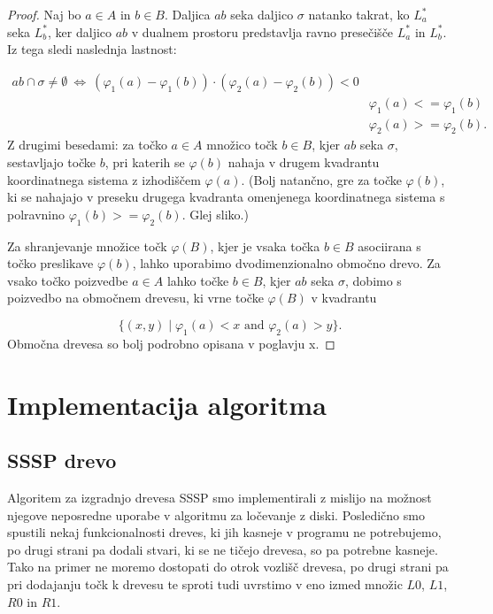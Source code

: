 \documentclass[a4paper, 12pt]{book}
\begin{document}
\begin{proof}
Naj bo $a \in A$ in $b \in B$. Daljica $ab$ seka daljico $\sigma$ natanko takrat, ko $L^*_a$ seka $L^*_b$, ker daljico $ab$ v dualnem prostoru predstavlja ravno presečišče $L^*_a$ in $L^*_b$. Iz tega sledi naslednja lastnost:

\begin{align*}
		ab \cap \sigma \neq \emptyset ~\Longleftrightarrow ~ 
		(\varphi_1(a)-\varphi_1(b)) \cdot (\varphi_2(a)- \varphi_2(b)) < 0\\
				&	\varphi_1(a) <= \varphi_1(b)\\
				&	\varphi_2(a) >= \varphi_2(b).
\end{align*}
Z drugimi besedami: za točko $a \in A$ množico točk $b \in B$, kjer $ab$ seka $\sigma$, sestavljajo točke $b$, pri katerih se $\varphi(b)$ nahaja v drugem kvadrantu koordinatnega sistema z izhodiščem $\varphi(a)$. (Bolj natančno, gre za točke $\varphi(b)$, ki se nahajajo v preseku drugega kvadranta omenjenega koordinatnega sistema s polravnino $\varphi_1(b) >= \varphi_2(b)$. Glej sliko.)

Za shranjevanje množice točk $\varphi(B)$, kjer je vsaka točka $b \in B$ asociirana s točko preslikave $\varphi(b)$, lahko uporabimo dvodimenzionalno območno drevo. Za vsako točko poizvedbe $a \in A$ lahko točke $b \in B$, kjer $ab$ seka $\sigma$, dobimo s poizvedbo na območnem drevesu, ki vrne točke $\varphi(B)$ v kvadrantu

\[
		\{(x,y)\mid  \varphi_1(a) < x \text{ and } \varphi_2(a) > y\}.
	\]
Območna drevesa so bolj podrobno opisana v poglavju x.

\end{proof}

\chapter{Implementacija algoritma}
\label{ch3}


\section{SSSP drevo}

Algoritem za izgradnjo drevesa SSSP smo implementirali z mislijo na možnost njegove neposredne uporabe v algoritmu za ločevanje z diski. Posledično smo spustili nekaj funkcionalnosti dreves, ki jih kasneje v programu ne potrebujemo, po drugi strani pa dodali stvari, ki se ne tičejo drevesa, so pa potrebne kasneje. Tako na primer ne moremo dostopati do otrok vozlišč drevesa, po drugi strani pa pri dodajanju točk k drevesu te sproti tudi uvrstimo v eno izmed množic $L0$, $L1$, $R0$ in $R1$.
\end{document}
